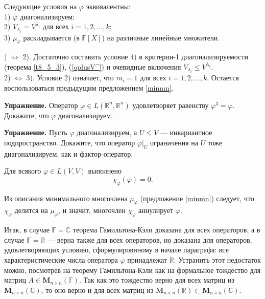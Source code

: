 \begin{predl}\label{kr_diag2}
Следующие условия на $\varphi$ эквивалентны:\\
1) $\varphi$ диагонализируем;\\
2) $V_{\lambda_i} = V^{\lambda_i}$ для всех $i=1, 2, \ldots, k$; \\ %
3) $\mu_{\varphi}$ раскладывается (в $\mathbb{F}[X]$) на различные линейные множители.
\end{predl}
) $\Leftrightarrow$ 2). Достаточно составить условие 4) в критерии-1 диагонализируемости (теорема \ref{t8_5_3}), 
(\ref{oplusV^}) и очевидные включения $V_{\lambda_i} \leq V^{\lambda_i}$.\\
2) $\Leftrightarrow$ 3). Условие 2) означает, что $m_i=1$ для всех $i=1, 2, \ldots, k$.
Остается воспользоваться предыдущим предложением \ref{minmn}.
\edok

\otstup

{\bf Упражнение.} Оператор $\varphi\in L(\mathbb{R}^n, \mathbb{R}^n)$ 
удовлетворяет равенству $\varphi ^3 = \varphi$. Докажите, что $\varphi$
диагонализируем.

\otstup


{\bf Упражнение.}
Пусть $\varphi$ диагонализируем, а $U\leq V$ --- инвариантное подпространство. 
Докажите, что оператор $\varphi |_U$ ограничения на $U$ тоже диагонализируем,
{\footnotesize как и фактор-оператор}.


\begin{theor}\label{HK} 
Для всякого $\varphi \in L(V, V)$ выполнено $$\chi_{\varphi}(\varphi) = 0. $$
\end{theor}
\dok Из описания минимального многочлена $\mu_{\varphi}$ (предложение \ref{minmn}) следует, что
$\chi_{\varphi}$ делится на $\mu_{\varphi}$, и значит, многочлен $\chi_{\varphi}$ аннулирует ${\varphi}$.
\edok

\otstup

Итак, в случае $\mathbb{F}=\mathbb{C}$ теорема Гамильтона-Кэли доказана для всех операторов, 
а в случае $\mathbb{F}=\mathbb{R}$ --- верна также для всех операторов, но доказана для 
операторов, удовлетворяющих условию, сформулировнному в начале параграфа: все характеристические числа оператора $\varphi$ принадлежат $\mathbb{R}$. Устранить этот недостаток можно, посмотрев на теорему Гамильтона-Кэли как
на формальное тождество для матриц $A\in \mathbf{M}_{n\times n}(\mathbb{F})$.
Так как это тождество верно для всех матриц из  $\mathbf{M}_{n\times n}(\mathbb{C})$, то оно верно 
и для всех матриц из  $\mathbf{M}_{n\times n}(\mathbb{R}) \subset \mathbf{M}_{n\times n}(\mathbb{C})$.

